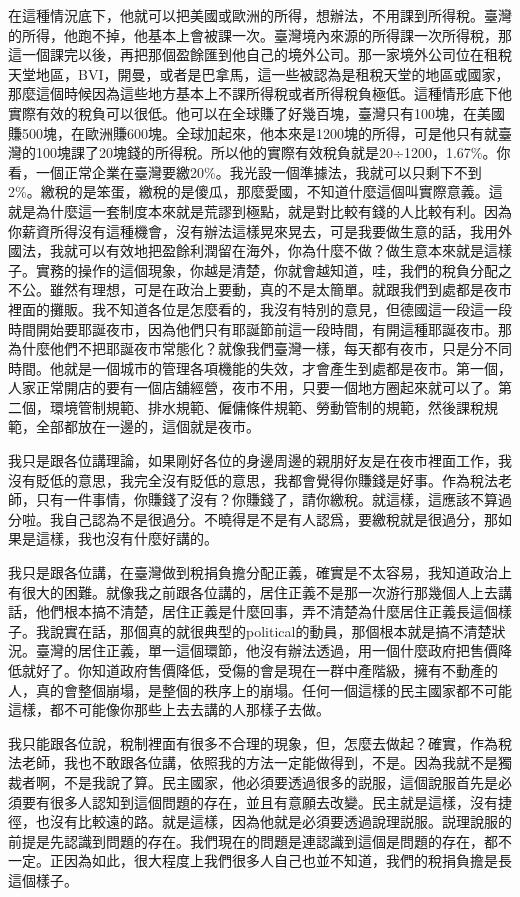 \documentclass[oneside,sub3section]{ctexbook}
\begin{document}
在這種情況底下，他就可以把美國或歐洲的所得，想辦法，不用課到所得稅。臺灣的所得，他跑不掉，他基本上會被課一次。臺灣境內來源的所得課一次所得稅，那這一個課完以後，再把那個盈餘匯到他自己的境外公司。那一家境外公司位在租稅天堂地區，BVI，開曼，或者是巴拿馬，這一些被認為是租稅天堂的地區或國家，那麼這個時候因為這些地方基本上不課所得稅或者所得稅負極低。這種情形底下他實際有效的稅負可以很低。他可以在全球賺了好幾百塊，臺灣只有100塊，在美國賺500塊，在歐洲賺600塊。全球加起來，他本來是1200塊的所得，可是他只有就臺灣的100塊課了20塊錢的所得稅。所以他的實際有效稅負就是20÷1200，1.67\%。你看，一個正常企業在臺灣要繳20\%。我光設一個準據法，我就可以只剩下不到2\%。繳稅的是笨蛋，繳稅的是傻瓜，那麼愛國，不知道什麼這個叫實際意義。這就是為什麼這一套制度本來就是荒謬到極點，就是對比較有錢的人比較有利。因為你薪資所得沒有這種機會，沒有辦法這樣晃來晃去，可是我要做生意的話，我用外國法，我就可以有效地把盈餘利潤留在海外，你為什麼不做？做生意本來就是這樣子。實務的操作的這個現象，你越是清楚，你就會越知道，哇，我們的稅負分配之不公。雖然有理想，可是在政治上要動，真的不是太簡單。就跟我們到處都是夜市裡面的攤販。我不知道各位是怎麼看的，我沒有特別的意見，但德國這一段這一段時間開始要耶誕夜市，因為他們只有耶誕節前這一段時間，有開這種耶誕夜市。那為什麼他們不把耶誕夜市常態化？就像我們臺灣一樣，每天都有夜市，只是分不同時間。他就是一個城市的管理各項機能的失效，才會產生到處都是夜市。第一個，人家正常開店的要有一個店舖經營，夜市不用，只要一個地方圈起來就可以了。第二個，環境管制規範、排水規範、僱傭條件規範、勞動管制的規範，然後課稅規範，全部都放在一邊的，這個就是夜市。

我只是跟各位講理論，如果剛好各位的身邊周邊的親朋好友是在夜市裡面工作，我沒有貶低的意思，我完全沒有貶低的意思，我都會覺得你賺錢是好事。作為稅法老師，只有一件事情，你賺錢了沒有？你賺錢了，請你繳稅。就這樣，這應該不算過分啦。我自己認為不是很過分。不曉得是不是有人認爲，要繳稅就是很過分，那如果是這樣，我也沒有什麼好講的。

我只是跟各位講，在臺灣做到稅捐負擔分配正義，確實是不太容易，我知道政治上有很大的困難。就像我之前跟各位講的，居住正義不是那一次游行那幾個人上去講話，他們根本搞不清楚，居住正義是什麼回事，弄不清楚為什麼居住正義長這個樣子。我說實在話，那個真的就很典型的political的動員，那個根本就是搞不清楚狀況。臺灣的居住正義，單一這個環節，他沒有辦法透過，用一個什麼政府把售價降低就好了。你知道政府售價降低，受傷的會是現在一群中產階級，擁有不動產的人，真的會整個崩塌，是整個的秩序上的崩塌。任何一個這樣的民主國家都不可能這樣，都不可能像你那些上去去講的人那樣子去做。

我只能跟各位說，稅制裡面有很多不合理的現象，但，怎麼去做起？確實，作為稅法老師，我也不敢跟各位講，依照我的方法一定能做得到，不是。因為我就不是獨裁者啊，不是我說了算。民主國家，他必須要透過很多的説服，這個說服首先是必須要有很多人認知到這個問題的存在，並且有意願去改變。民主就是這樣，沒有捷徑，也沒有比較遠的路。就是這樣，因為他就是必須要透過說理説服。説理說服的前提是先認識到問題的存在。我們現在的問題是連認識到這個是問題的存在，都不一定。正因為如此，很大程度上我們很多人自己也並不知道，我們的稅捐負擔是長這個樣子。
\end{document}
